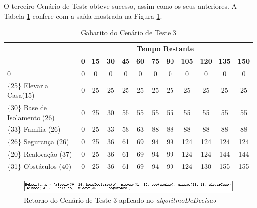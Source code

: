 	O terceiro Cenário de Teste obteve sucesso, assim como os seus anteriores. A Tabela \ref{gabarito3} confere com a saída mostrada na Figura \ref{resultado3}.
	
\begin{table}[!h]
\centering
\caption{Gabarito do Cenário de Teste 3}
\label{gabarito3}
\begin{tabular}{lccccccccccc}
\multicolumn{1}{c}{\cellcolor[HTML]{00D2CB}} & \multicolumn{11}{c}{\cellcolor[HTML]{00D2CB}\textbf{Tempo Restante}} \\ 
\multicolumn{1}{c}{\cellcolor[HTML]{00D2CB}{\color[HTML]{333333} \textbf{\{Valor\} Missão(Tempo)}}} & 
\multicolumn{1}{l}{\cellcolor[HTML]{C0F2F0}\textbf{0}} & 
\multicolumn{1}{l}{\cellcolor[HTML]{C0F2F0}\textbf{15}} & 
\multicolumn{1}{l}{\cellcolor[HTML]{C0F2F0}\textbf{30}} & 
\multicolumn{1}{l}{\cellcolor[HTML]{C0F2F0}\textbf{45}} & 
\multicolumn{1}{l}{\cellcolor[HTML]{C0F2F0}\textbf{60}} & 
\multicolumn{1}{l}{\cellcolor[HTML]{C0F2F0}\textbf{75}} & 
\multicolumn{1}{l}{\cellcolor[HTML]{C0F2F0}\textbf{90}} & 
\multicolumn{1}{l}{\cellcolor[HTML]{C0F2F0}\textbf{105}} & 
\multicolumn{1}{l}{\cellcolor[HTML]{C0F2F0}\textbf{120}} & 
\multicolumn{1}{l}{\cellcolor[HTML]{C0F2F0}\textbf{135}} & 
\multicolumn{1}{l}{\cellcolor[HTML]{C0F2F0}\textbf{150}} \\ 
0 & 0 & 0 & 0 & 0 & 0 & 0 & 0 & 0 & 0 & 0 & 0  \\ 
\{25\}  Elevar a Casa(15)& 0 & 25 & 25 & 25 & 25  & 25  & 25  & 25 & 25 & 25 & 25 \\ 
\{30\}  Base de Isolamento (26) & 0 & 25 & 30 & 55 & 55  & 55  & 55  & 55 & 55 & 55 & 55 \\ 
\{33\}  Família (26) & 0 & 25 & 33 & 58 & 63  & 88  & 88  & 88 & 88 & 88 & 88 \\ 
\{26\}  Segurança (26) & 0 & 25 & 36 & 61 & 69  & 94  & 99  & 124 & 124 & 124 & 124 \\ 
{\color[HTML]{FE0000} \{20\}  Realocação (37)} & 0 & 25 & 36 & 61 & 69  & 94  & 99  & 124 & 124 & 144 & 144 \\ 
\{31\}  Obstáculos (40) & 0 & 25 & 36 & 61 & 69  & 94  & 99  & 124 & 130 & 155 & 155 \\ 
\end{tabular}
\end{table}

	
\FloatBarrier
\begin{figure}[!h]
\centering
\includegraphics[keepaspectratio=true,scale=0.7]{figuras/resultado3.png}
\caption{Retorno do Cenário de Teste 3 aplicado no \textit{algoritmoDeDecisao}}
\label{resultado3}
\end{figure}


